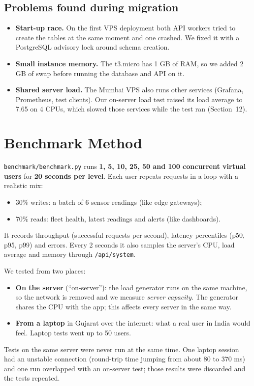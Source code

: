 \documentclass[12pt,a4paper]{article}
\begin{document}
\subsection{Problems found during migration}
\begin{itemize}
  \item \textbf{Start-up race.} On the first VPS deployment both API workers tried to create the tables at
        the same moment and one crashed. We fixed it with a PostgreSQL advisory lock around schema
        creation.
  \item \textbf{Small instance memory.} The t3.micro has 1 GB of RAM, so we added 2 GB of swap before
        running the database and API on it.
  \item \textbf{Shared server load.} The Mumbai VPS also runs other services (Grafana, Prometheus, test
        clients). Our on-server load test raised its load average to 7.65 on 4 CPUs, which slowed those
        services while the test ran (Section~12).
\end{itemize}

\section{Benchmark Method}
\texttt{benchmark/benchmark.py} runs \textbf{1, 5, 10, 25, 50 and 100 concurrent virtual users} for
\textbf{20 seconds per level}. Each user repeats requests in a loop with a realistic mix:
\begin{itemize}
  \item 30\% writes: a batch of 6 sensor readings (like edge gateways);
  \item 70\% reads: fleet health, latest readings and alerts (like dashboards).
\end{itemize}
It records throughput (successful requests per second), latency percentiles (p50, p95, p99) and
errors. Every 2 seconds it also samples the server's CPU, load average and memory through
\texttt{/api/system}.

We tested from two places:
\begin{itemize}
  \item \textbf{On the server} (``on-server''): the load generator runs on the same machine, so the
        network is removed and we measure \emph{server capacity}. The generator shares the CPU with the
        app; this affects every server in the same way.
  \item \textbf{From a laptop} in Gujarat over the internet: what a real user in India would feel.
        Laptop tests went up to 50 users.
\end{itemize}
Tests on the same server were never run at the same time. One laptop session had an unstable
connection (round-trip time jumping from about 80 to 370 ms) and one run overlapped with an on-server
test; those results were discarded and the tests repeated.
\end{document}
